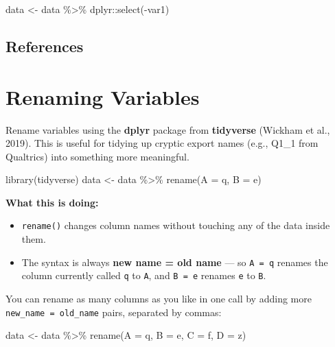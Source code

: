 \documentclass[
  letterpaper,
  DIV=11,
  numbers=noendperiod]{scrreprt}
\newenvironment{Shaded}{\begin{snugshade}}{\end{snugshade}}
\newcommand{\AttributeTok}[1]{\textcolor[rgb]{0.40,0.45,0.13}{#1}}
\newcommand{\FunctionTok}[1]{\textcolor[rgb]{0.28,0.35,0.67}{#1}}
\newcommand{\NormalTok}[1]{\textcolor[rgb]{0.00,0.23,0.31}{#1}}
\newcommand{\OtherTok}[1]{\textcolor[rgb]{0.00,0.23,0.31}{#1}}
\newcommand{\SpecialCharTok}[1]{\textcolor[rgb]{0.37,0.37,0.37}{#1}}
\begin{document}
\begin{Shaded}
\begin{Highlighting}[]
\NormalTok{data }\OtherTok{\textless{}{-}}\NormalTok{ data }\SpecialCharTok{\%\textgreater{}\%}
\NormalTok{  dplyr}\SpecialCharTok{::}\FunctionTok{select}\NormalTok{(}\SpecialCharTok{{-}}\NormalTok{var1)}
\end{Highlighting}
\end{Shaded}

\section{References}\label{references-1}

\chapter{Renaming Variables}\label{renaming-variables}

Rename variables using the \textbf{dplyr} package from
\textbf{tidyverse} (Wickham et al., 2019). This is useful for tidying up
cryptic export names (e.g., Q1\_1 from Qualtrics) into something more
meaningful.

\begin{Shaded}
\begin{Highlighting}[]
\FunctionTok{library}\NormalTok{(tidyverse)}
\NormalTok{data }\OtherTok{\textless{}{-}}\NormalTok{ data }\SpecialCharTok{\%\textgreater{}\%} 
  \FunctionTok{rename}\NormalTok{(}\AttributeTok{A =}\NormalTok{ q, }\AttributeTok{B =}\NormalTok{ e)}
\end{Highlighting}
\end{Shaded}

\textbf{What this is doing:}

\begin{itemize}
\item
  \texttt{rename()} changes column names without touching any of the
  data inside them.
\item
  The syntax is always \textbf{new name = old name} --- so
  \texttt{A\ =\ q} renames the column currently called \texttt{q} to
  \texttt{A}, and \texttt{B\ =\ e} renames \texttt{e} to \texttt{B}.
\end{itemize}

You can rename as many columns as you like in one call by adding more
\texttt{new\_name\ =\ old\_name} pairs, separated by commas:

\begin{Shaded}
\begin{Highlighting}[]
\NormalTok{data }\OtherTok{\textless{}{-}}\NormalTok{ data }\SpecialCharTok{\%\textgreater{}\%}
  \FunctionTok{rename}\NormalTok{(}\AttributeTok{A =}\NormalTok{ q,}
         \AttributeTok{B =}\NormalTok{ e,}
         \AttributeTok{C =}\NormalTok{ f,}
         \AttributeTok{D =}\NormalTok{ z)}
\end{Highlighting}
\end{Shaded}
\end{document}
